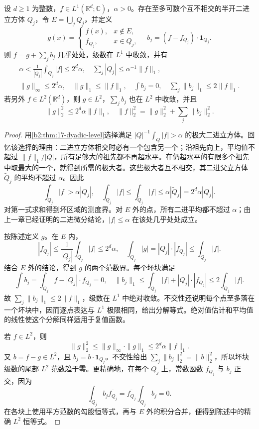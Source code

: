 \begin{theorem}\label{b2:thm:18-cz-decomposition}
设 \(d\geq1\) 为整数，\(f\in L^1(\mathbb R^d;\mathbb C)\)，\(\alpha>0\)。存在至多可数个互不相交的半开二进立方体 \(Q_j\)，令 \(E=\bigcup_jQ_j\)，并定义
\[
 g(x)=\begin{cases}
 f(x),&x\notin E,\\
 f_{Q_j},&x\in Q_j,
 \end{cases}
 \quad b_j=(f-f_{Q_j})\cdot\mathbf1_{Q_j}.
\]
则 \(f=g+\sum_jb_j\) 几乎处处，级数在 \(L^1\) 中收敛，并有
\[
 \begin{gathered}
 \alpha<\frac1{|Q_j|}\int_{Q_j}|f|\leq2^d\alpha,
 \quad \sum_j|Q_j|\leq\alpha^{-1}\|f\|_1,\\
 \|g\|_\infty\leq2^d\alpha,
 \quad\|g\|_1\leq\|f\|_1,
 \quad\int b_j=0,
 \quad\sum_j\|b_j\|_1\leq2\|f\|_1.
 \end{gathered}
\]
若另外 \(f\in L^2(\mathbb R^d)\)，则 \(g\in L^2\)，\(\sum_jb_j\) 也在 \(L^2\) 中收敛，并且
\[
 \|g\|_2^2\leq2^d\alpha\|f\|_1,
 \quad \|f\|_2^2=\|g\|_2^2+\sum_j\|b_j\|_2^2.
\]
\end{theorem}
\begin{proof}
用\cref{b2:thm:17-dyadic-level}选择满足
\(|Q|^{-1}\int_Q|f|>\alpha\) 的极大二进立方体。回忆该选择的理由：二进立方体相交时必有一个包含另一个；沿祖先向上，平均值不超过 \(\|f\|_1/|Q|\)，所有足够大的祖先都不再超水平。在仍超水平的有限多个祖先中取最大的一个，就得到所需的极大者。这些极大者互不相交，其二进父立方体 \(\widetilde Q_j\) 的平均不超过 \(\alpha\)。因此
\[
 \int_{Q_j}|f|>\alpha|Q_j|,
 \quad \int_{Q_j}|f|\leq\int_{\widetilde Q_j}|f|
 \leq\alpha|\widetilde Q_j|=2^d\alpha|Q_j|.
\]
对第一式求和得到坏区域的测度界。对 \(E\) 外的点，所有二进平均都不超过 \(\alpha\)；由上一章已经证明的二进微分结论，\(|f|\leq\alpha\) 在该处几乎处处成立。

按陈述定义 \(g\)。在 \(E\) 内，
\[
 |f_{Q_j}|\leq\frac1{|Q_j|}\int_{Q_j}|f|\leq2^d\alpha,
 \quad \int_{Q_j}|g|=|Q_j|\cdot|f_{Q_j}|
                          \leq\int_{Q_j}|f|.
\]
结合 \(E\) 外的结论，得到 \(g\) 的两个范数界。每个坏块满足
\[
 \int b_j=\int_{Q_j}f-|Q_j|\cdot f_{Q_j}=0,
 \quad \|b_j\|_1\leq\int_{Q_j}|f|+|Q_j|\cdot|f_{Q_j}|
                         \leq2\int_{Q_j}|f|.
\]
故 \(\sum_j\|b_j\|_1\leq2\|f\|_1\)，级数在 \(L^1\) 中绝对收敛。不交性还说明每个点至多落在一个坏块中，因而逐点表达与 \(L^1\) 极限相同，给出分解等式。绝对值估计和平均值的线性使这个分解同样适用于复值函数。

若 \(f\in L^2\)，则
\[
 \|g\|_2^2\leq\|g\|_\infty\cdot\|g\|_1
                         \leq2^d\alpha\|f\|_1.
\]
又 \(b=f-g\in L^2\)，且 \(b_j=b\cdot\mathbf1_{Q_j}\)。不交性给出
\(\sum_j\|b_j\|_2^2=\|b\|_2^2\)，所以坏块级数的尾部 \(L^2\) 范数趋于零。更精确地，在每个 \(Q_j\) 上，常数函数 \(f_{Q_j}\) 与 \(b_j\) 正交，因为
\[
 \int_{Q_j}b_j\overline{f_{Q_j}}
 =\overline{f_{Q_j}}\int_{Q_j}b_j=0.
\]
在各块上使用平方范数的勾股恒等式，再与 \(E\) 外的积分合并，便得到陈述中的精确 \(L^2\) 恒等式。
\end{proof}
